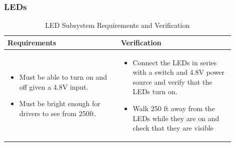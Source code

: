 \subsubsection{LEDs}
    \begin{table}[ht]
        \centering
        \caption{LED Subsystem Requirements and Verification}
        \begin{tabular}{p{0.45\linewidth}p{0.45\linewidth}}
        \toprule
        \textbf{Requirements} & \textbf{Verification} \\
        \midrule
        \begin{itemize}[leftmargin=*, nosep]
            \item Must be able to turn on and off given a 4.8V input.
            \item Must be bright enough for drivers to see from 250ft.
            
        \end{itemize} &
        \begin{itemize}[leftmargin=*, nosep]
            \item Connect the LEDs in series with a switch and 4.8V power source and verify that the LEDs turn on.
            \item Walk 250 ft away from the LEDs while they are on and check that they are visible
        
        \end{itemize} \\
        \bottomrule
        \end{tabular}
        \end{table}
        \newpage
